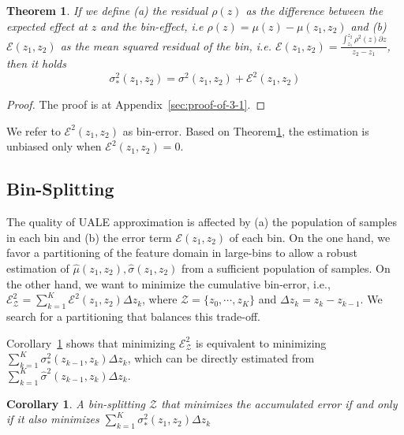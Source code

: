 \documentclass[twoside]{article}
\newtheorem{theorem}{Theorem}[section]
\newtheorem{corollary}{Corollary}[theorem]
\begin{document}
\begin{theorem}
  \label{sec:theorem-1}
  If we define (a) the residual \(\rho(z)\) as the difference between
  the expected effect at \(z\) and the bin-effect, i.e
  \(\rho(z) = \mu(z) - \mu(z_1, z_2)\) and (b)
  \(\mathcal{E}(z_1, z_2)\) as the mean squared residual of the bin,
  i.e.
  \(\mathcal{E}(z_1, z_2) = \frac{\int_{z_1}^{z_2}\rho^2(z) \partial
    z}{z_2 - z_1}\), then it holds
\begin{equation}
    \label{eq:bin-uncertainty-proof}
 \sigma_*^2(z_1, z_2) = \sigma^2(z_1, z_2) + \mathcal{E}^2(z_1, z_2)
\end{equation}
  \end{theorem}

\begin{proof}
The proof is at Appendix~\ref{sec:proof-of-3-1}.
\end{proof}

\noindent

We refer to \(\mathcal{E}^2(z_1, z_2)\) as bin-error. Based on
Theorem\ref{sec:theorem-1}, the estimation is unbiased only when
\(\mathcal{E}^2(z_1, z_2) = 0\).

\subsection{Bin-Splitting}
\label{sec:bin-spliting}

The quality of UALE approximation is affected by (a) the population of
samples in each bin and (b) the error term \(\mathcal{E}(z_1, z_2)\)
of each bin. On the one hand, we favor a partitioning of the feature
domain in large-bins to allow a robust estimation of
\(\hat{\mu}(z_1, z_2), \hat{\sigma}(z_1, z_2)\) from a sufficient
population of samples. On the other hand, we want to minimize the
cumulative bin-error, i.e.,
\( \mathcal{E}^2_{\mathcal{Z}} = \sum_{k=1}^K\mathcal{E}^2(z_1, z_2)
\Delta z_k\), where \(\mathcal{Z} = \{z_0, \cdots, z_K\}\) and
\(\Delta z_k = z_k - z_{k-1}\). We search for a partitioning that
balances this trade-off.

Corollary~\ref{sec:coroll} shows that minimizing
\( \mathcal{E}^2_{\mathcal{Z}} \) is equivalent to minimizing
\(\sum_{k=1}^K \sigma_*^2(z_{k-1}, z_k)\Delta z_k\), which can be directly
estimated from \(\sum_{k=1}^K \hat{\sigma}^2(z_{k-1}, z_k) \Delta z_k \).

\begin{corollary}
  \label{sec:coroll}
  A bin-splitting \(\mathcal{Z}\) that minimizes the accumulated error
  if and only if it also minimizes
  \(\sum_{k=1}^K\sigma_*^2(z_1, z_2) \Delta z_k \)
\end{corollary}
\end{document}
